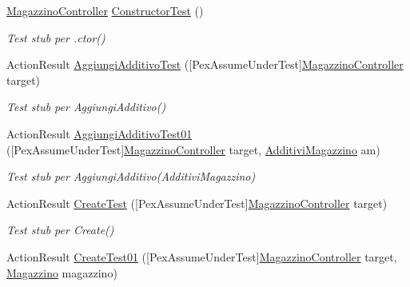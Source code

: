 \begin{DoxyCompactItemize}
\item 
\mbox{\hyperlink{class_brew_day2_1_1_controllers_1_1_magazzino_controller}{Magazzino\+Controller}} \mbox{\hyperlink{class_brew_day2_1_1_controllers_1_1_tests_1_1_magazzino_controller_test_a6973f384a669af5ee1c898a76c700a67}{Constructor\+Test}} ()
\begin{DoxyCompactList}\small\item\em Test stub per .ctor()\end{DoxyCompactList}\item 
Action\+Result \mbox{\hyperlink{class_brew_day2_1_1_controllers_1_1_tests_1_1_magazzino_controller_test_a369eb4e6f98dd76af7f9b1ad1675d120}{Aggiungi\+Additivo\+Test}} (\mbox{[}Pex\+Assume\+Under\+Test\mbox{]}\mbox{\hyperlink{class_brew_day2_1_1_controllers_1_1_magazzino_controller}{Magazzino\+Controller}} target)
\begin{DoxyCompactList}\small\item\em Test stub per Aggiungi\+Additivo()\end{DoxyCompactList}\item 
Action\+Result \mbox{\hyperlink{class_brew_day2_1_1_controllers_1_1_tests_1_1_magazzino_controller_test_aed56fd722a871036f48788579ab0dc15}{Aggiungi\+Additivo\+Test01}} (\mbox{[}Pex\+Assume\+Under\+Test\mbox{]}\mbox{\hyperlink{class_brew_day2_1_1_controllers_1_1_magazzino_controller}{Magazzino\+Controller}} target, \mbox{\hyperlink{class_brew_day2_1_1_models_1_1_additivi_magazzino}{Additivi\+Magazzino}} am)
\begin{DoxyCompactList}\small\item\em Test stub per Aggiungi\+Additivo(\+Additivi\+Magazzino)\end{DoxyCompactList}\item 
Action\+Result \mbox{\hyperlink{class_brew_day2_1_1_controllers_1_1_tests_1_1_magazzino_controller_test_a101ad311c0e5adc51b5165237293768b}{Create\+Test}} (\mbox{[}Pex\+Assume\+Under\+Test\mbox{]}\mbox{\hyperlink{class_brew_day2_1_1_controllers_1_1_magazzino_controller}{Magazzino\+Controller}} target)
\begin{DoxyCompactList}\small\item\em Test stub per Create()\end{DoxyCompactList}\item 
Action\+Result \mbox{\hyperlink{class_brew_day2_1_1_controllers_1_1_tests_1_1_magazzino_controller_test_a049a60c6b0f6c62161d66a8499b80daa}{Create\+Test01}} (\mbox{[}Pex\+Assume\+Under\+Test\mbox{]}\mbox{\hyperlink{class_brew_day2_1_1_controllers_1_1_magazzino_controller}{Magazzino\+Controller}} target, \mbox{\hyperlink{class_brew_day2_1_1_models_1_1_magazzino}{Magazzino}} magazzino)

\end{DoxyCompactItemize}

